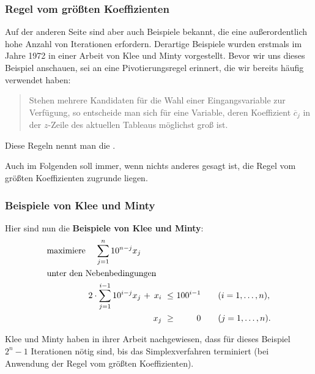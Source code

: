 \documentclass[smaller]{beamer}
\begin{document}
\begin{frame}
 \frametitle{Regel vom größten Koeffizienten}
 \alert{Auf der anderen Seite sind aber auch Beispiele bekannt, die eine außerordentlich hohe Anzahl von Iterationen erfordern}. Derartige Beispiele wurden erstmals im Jahre 1972 in einer Arbeit von Klee und Minty vorgestellt. Bevor wir uns dieses Beispiel anschauen, sei an eine Pivotierungsregel erinnert, die wir bereits häufig verwendet haben: \\ \vspace*{0.2cm}
\begin{quote}
{Stehen mehrere Kandidaten für die Wahl einer Eingangsvariable} 
{zur Verfügung, so entscheide man sich für eine Variable, deren Koeffizient $\overline{c}_j$ } 
{in der $z$-Zeile des aktuellen Tableaus \alert{möglichst groß} ist.}
\end{quote}

Diese Regeln nennt man die .

Auch im Folgenden soll immer, wenn nichts anderes gesagt ist, die Regel vom größten Koeffizienten zugrunde liegen.
\end{frame}

\begin{frame}
 \frametitle{Beispiele von Klee und Minty}
 Hier sind nun die \textbf{Beispiele von Klee und Minty}:
\begin{align*}
\begin{alignedat}{5}
& \text{maximiere } & \sum\limits_{j=1}^{n}{10^{n-j}x_j} & & & & & \\
& \rlap{unter den Nebenbedingungen} & & & & & & \\
&& 2 \cdot \sum\limits_{j=1}^{i-1}{10^{i-j}x_j} &\ + &\ x_i &\ \leq &\ 100^{i-1} & \qquad (i=1,\ldots,n), \\
&&                                              &    &\ x_j &\ \geq &\         0 & \qquad (j=1,\ldots,n).
\end{alignedat}
\end{align*}

Klee und Minty haben in ihrer Arbeit nachgewiesen, dass für dieses Beispiel \alert{$2^n-1$ Iterationen} nötig sind, bis das Simplexverfahren terminiert (bei Anwendung der Regel vom größten Koeffizienten).
\end{frame}
\end{document}
